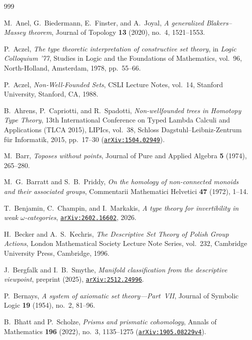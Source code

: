\begin{thebibliography}{999}

M.~Anel, G.~Biedermann, E.~Finster, and A.~Joyal,
\emph{A generalized Blakers--Massey theorem},
Journal of Topology \textbf{13} (2020), no.~4, 1521--1553.

P.~Aczel,
\emph{The type theoretic interpretation of constructive set theory},
in \emph{Logic Colloquium '77}, Studies in Logic and the Foundations of Mathematics, vol.~96, North-Holland, Amsterdam, 1978, pp.~55--66.

P.~Aczel,
\emph{Non-Well-Founded Sets},
CSLI Lecture Notes, vol.~14, Stanford University, Stanford, CA, 1988.

B.~Ahrens, P.~Capriotti, and R.~Spadotti,
\emph{Non-wellfounded trees in Homotopy Type Theory},
13th International Conference on Typed Lambda Calculi and Applications (TLCA 2015), LIPIcs, vol.~38, Schloss Dagstuhl--Leibniz-Zentrum f\"ur Informatik, 2015, pp.~17--30 (\href{https://arxiv.org/abs/1504.02949}{\texttt{arXiv:1504.02949}}).

M.~Barr,
\emph{Toposes without points},
Journal of Pure and Applied Algebra \textbf{5} (1974), 265--280.

M.~G.~Barratt and S.~B.~Priddy,
\emph{On the homology of non-connected monoids and their associated groups},
Commentarii Mathematici Helvetici \textbf{47} (1972), 1--14.

T.~Benjamin, C.~Champin, and I.~Markakis,
\emph{A type theory for invertibility in weak $\omega$-categories},
\href{https://arxiv.org/abs/2602.16602}{\texttt{arXiv:2602.16602}}, 2026.

H.~Becker and A.~S.~Kechris,
\emph{The Descriptive Set Theory of Polish Group Actions},
London Mathematical Society Lecture Note Series, vol.~232, Cambridge University Press, Cambridge, 1996.

J.~Bergfalk and I.~B.~Smythe,
\emph{Manifold classification from the descriptive viewpoint},
preprint (2025), \href{https://arxiv.org/abs/2512.24996}{\texttt{arXiv:2512.24996}}.

P.~Bernays,
\emph{A system of axiomatic set theory---Part~VII},
Journal of Symbolic Logic \textbf{19} (1954), no.~2, 81--96.

B.~Bhatt and P.~Scholze,
\emph{Prisms and prismatic cohomology},
Annals of Mathematics \textbf{196} (2022), no.~3, 1135--1275 (\href{https://arxiv.org/abs/1905.08229v4}{\texttt{arXiv:1905.08229v4}}).


\end{thebibliography}
